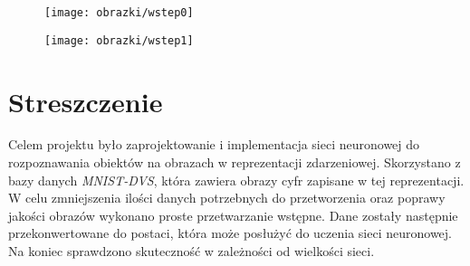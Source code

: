\documentclass[11pt,a4paper,titlepage]{article}
\begin{document}
%

\begin{center}
\begin{figure}[H]
	\centering
	\texttt{[image: obrazki/wstep0]}
\end{figure}
\end{center}

\begin{center}
\begin{figure}[H]
	\centering
	\texttt{[image: obrazki/wstep1]}
\end{figure}
\end{center}

\section*{Streszczenie}
Celem projektu było zaprojektowanie i implementacja sieci neuronowej do rozpoznawania obiektów na obrazach w reprezentacji zdarzeniowej. Skorzystano z bazy danych \textit{MNIST-DVS}, która zawiera obrazy cyfr zapisane w tej reprezentacji. W celu zmniejszenia ilości danych potrzebnych do przetworzenia oraz poprawy jakości obrazów wykonano proste przetwarzanie wstępne. Dane zostały następnie przekonwertowane do postaci, która może posłużyć do uczenia sieci neuronowej. Na koniec sprawdzono skuteczność w zależności od wielkości sieci.
 
\clearpage
\tableofcontents
\clearpage








\appendix
\nocite{*}

%
%
%
\printbibliography





\end{document}
